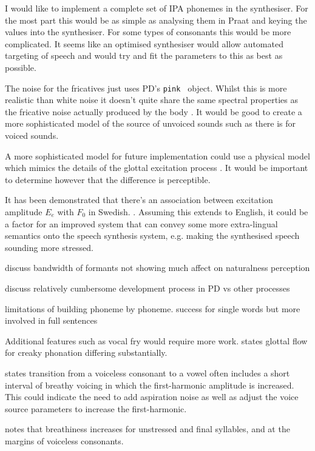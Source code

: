 I would like to implement a complete set of IPA phonemes in the synthesiser. For the most part this would be as simple as analysing them in Praat and keying the values into the synthesiser. For some types of consonants this would be more complicated. It seems like an optimised synthesiser would allow automated targeting of speech and would try and fit the parameters to this as best as possible.

The noise for the fricatives just uses PD's \texttt{pink~} object. Whilst this is more realistic than white noise it doesn't quite share the same spectral properties as the fricative noise actually produced by the body \cite{Johnson2003}. It would be good to create a more sophisticated model of the source of unvoiced sounds such as there is for voiced sounds.

A more sophisticated model for future implementation could use a physical model which mimics the details of the glottal excitation process \cite{Liljencrants1995}. It would be important to determine however that the difference is perceptible.

It has been demonstrated that there's an association between excitation amplitude $E_e$ with $F_0$ in Swedish. \cite{Fant1994}. Assuming this extends to English, it could be a factor for an improved system that can convey some more extra-lingual semantics onto the speech synthesis system, e.g. making the synthesised speech sounding more stressed.

discuss bandwidth of formants not showing much affect on naturalness perception

discuss relatively cumbersome development process in PD vs other processes

limitations of building phoneme by phoneme. success for single words but more involved in full sentences

Additional features such as vocal fry would require more work. \cite{Gobl1988} states glottal flow for creaky phonation differing substantially.

\cite{Klatt1990} states transition from a voiceless consonant to a vowel often includes a short interval of breathy voicing in which the first-harmonic amplitude is increased. This could indicate the need to add aspiration noise as well as adjust the voice source parameters to increase the first-harmonic.

\cite{Klatt1990} notes that breathiness increases for unstressed  and final syllables, and at the margins of voiceless consonants.

